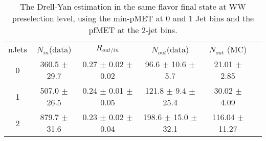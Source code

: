 \begin{table}
\begin{center}
\begin{tabular}{c c c c c c}
\hline
       nJets & $N_{in}$(data)        & $R_{out/in}$        & $N_{out}$(data)  & $N_{out}$ (MC) \\ 
0 & 360.5 $\pm$ 29.7 & 0.27 $\pm$ 0.02 $\pm$ 0.02 & 96.6 $\pm$ 10.6 $\pm$ 5.7 & 21.01 $\pm$ 2.85 \\
1 & 507.0 $\pm$ 26.5 & 0.24 $\pm$ 0.01 $\pm$ 0.05 & 121.8 $\pm$ 9.4 $\pm$ 25.4  & 30.02 $\pm$ 4.09 \\
2 & 879.7 $\pm$ 31.6 & 0.23 $\pm$ 0.02 $\pm$ 0.04 & 198.6 $\pm$ 15.0 $\pm$ 32.1  & 116.04 $\pm$ 11.27 \\
\hline
\end{tabular}
\caption{\fixme The Drell-Yan estimation in the same flavor final state at WW preselection level, using the min-pMET at 
0 and 1 Jet bins and the pfMET at the 2-jet bins. }
\label{tab:dy_wwlevel}
\end{center}
\end{table}

